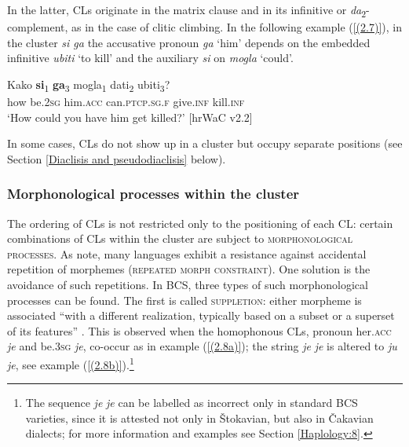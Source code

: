 \noindent In the latter, CLs originate in the matrix clause and in its infinitive or \textit{da}\textsubscript{2}-com\-ple\-ment, as in the case of clitic climbing. In the following example (\ref{(2.7)}), in the cluster \textit{si ga} the accusative pronoun \textit{ga} `him' depends on the embedded infinitive \textit{ubiti} `to kill' and the auxiliary \textit{si} on \textit{mogla} `could'.


\begin{exe}\ex\label{(2.7)}
\gll Kako \textbf{si}\textsubscript{1} \textbf{ga}\textsubscript{3} mogla\textsubscript{1} dati\textsubscript{2} ubiti\textsubscript{3}?\\
 how be\textsc{.2sg} him\textsc{.acc} can\textsc{.ptcp.sg.f} give\textsc{.inf} kill\textsc{.inf}\\
\glt ‘How could you have him get killed?’
\hfill [hrWaC v2.2]
\end{exe}


\noindent In some cases, CLs do not show up in a cluster but occupy separate positions (see Section \ref{Diaclisis and pseudodiaclisis} below).

\subsubsection{Morphonological processes within the cluster}
\label{Morphonological processes within the cluster}
The ordering of CLs is not restricted only to the positioning of each CL: certain combinations of CLs within the cluster are subject to \textsc{morphonological processes}. As \citet[685]{NeelemanKoot06}  note, many languages exhibit a resistance against accidental repetition of morphemes (\textsc{repeated} \textsc{morph} \textsc{constraint}). One solution is the avoidance of such repetitions. In BCS, three types of such morphonological processes can be found. The first is called \textsc{suppletion}: either morpheme is associated ``with a different realization, typically based on a subset or a superset of its features'' \citep[686]{NeelemanKoot06}. This is observed when the homophonous CLs, prono­un her.\textsc{acc} \textit{je} and be.3\textsc{sg} \textit{je}, co-occur as in example (\ref{(2.8a)}); the string \textit{je} \textit{je} is altered to \textit{ju je}, see example (\ref{(2.8b)}).\footnote{The sequence \textit{je} \textit{je} can be labelled as incorrect only in standard BCS varieties, since it is attested not only in Štokavian, but also in Čakavian dialects; for more information and examples see Section \ref{Haplology:8}.}

